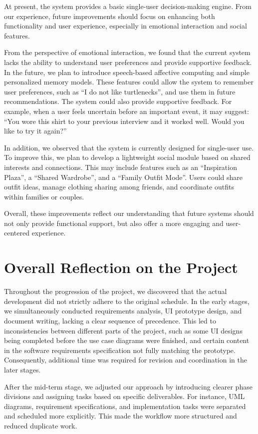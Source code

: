 At present, the system provides a basic single-user decision-making engine. From our experience, future improvements should focus on enhancing both functionality and user experience, especially in emotional interaction and social features.

From the perspective of emotional interaction, we found that the current system lacks the ability to understand user preferences and provide supportive feedback. In the future, we plan to introduce speech-based affective computing and simple personalized memory models. These features could allow the system to remember user preferences, such as “I do not like turtlenecks”, and use them in future recommendations. The system could also provide supportive feedback. For example, when a user feels uncertain before an important event, it may suggest: “You wore this shirt to your previous interview and it worked well. Would you like to try it again?”

In addition, we observed that the system is currently designed for single-user use. To improve this, we plan to develop a lightweight social module based on shared interests and connections. This may include features such as an “Inspiration Plaza”, a “Shared Wardrobe”, and a “Family Outfit Mode”. Users could share outfit ideas, manage clothing sharing among friends, and coordinate outfits within families or couples.

Overall, these improvements reflect our understanding that future systems should not only provide functional support, but also offer a more engaging and user-centered experience.



\section{Overall Reflection on the Project}
Throughout the progression of the project, we discovered that the actual development did not strictly adhere to the original schedule. In the early stages, we simultaneously conducted requirements analysis, UI prototype design, and document writing, lacking a clear sequence of precedence. This led to inconsistencies between different parts of the project, such as some UI designs being completed before the use case diagrams were finished, and certain content in the software requirements specification not fully matching the prototype. Consequently, additional time was required for revision and coordination in the later stages.

After the mid-term stage, we adjusted our approach by introducing clearer phase divisions and assigning tasks based on specific deliverables. For instance, UML diagrams, requirement specifications, and implementation tasks were separated and scheduled more explicitly. This made the workflow more structured and reduced duplicate work.

